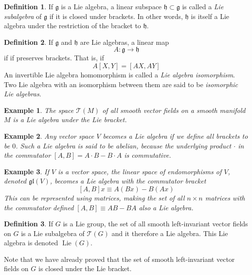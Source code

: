 \documentclass{article}
\DeclareMathOperator{\Lie}{Lie}
\newtheorem{example}{Example}[section]
\theoremstyle{remark}
\theoremstyle{definition}
\newtheorem{definition}{Definition}[section]
\begin{document}
\begin{definition}
If $\mathfrak{g}$ is a Lie algebra, a linear subspace $\mathfrak{h} \subset \mathfrak{g}$ is called a \textit{Lie subalgebra} of $\mathfrak{g}$ if it is closed under brackets. In other words, $\mathfrak{h}$ is itself a Lie algebra under the restriction of the bracket to $\mathfrak{h}$. 
\end{definition}

\begin{definition}
If $\mathfrak{g}$ and $\mathfrak{h}$ are Lie algebras, a linear map 
\[A: \mathfrak{g} \longrightarrow \mathfrak{h}\]
if if preserves brackets. That is, if 
\[A[X, Y] = [AX, AY]\]
An invertible Lie algebra homomorphism is called a \textit{Lie algebra isomorphism}. Two Lie algebra with an isomorphism between them are said to be \textit{isomorphic Lie algebras}. 
\end{definition}

\begin{example}
The space $\mathcal{T}(M)$ of all smooth vector fields on a smooth manifold $M$ is a Lie algebra under the Lie bracket. 
\end{example}

\begin{example}
Any vector space $V$ becomes a Lie algebra if we define all brackets to be $0$. Such a Lie algebra is said to be \textit{abelian}, because the underlying product $\cdot$ in the commutator $[A,B] = A \cdot B - B \cdot A$ is commutative. 
\end{example}

\begin{example}
If $V$ is a vector space, the linear space of endomorphisms of $V$, denoted $\mathfrak{gl}(V)$, becomes a Lie algebra with the commutator bracket
\[[A,B] x \equiv A (Bx) - B (Ax)\]
This can be represented using matrices, making the set of all $n \times n$ matrices with the commutator defined $[A,B] \equiv A B - B A$ also a Lie algebra. 
\end{example}

\begin{definition}
If $G$ is a Lie group, the set of all smooth left-invariant vector fields on $G$ is a Lie subalgebra of $\mathcal{T}(G)$ and it therefore a Lie algebra. This Lie algebra is denoted $\Lie(G)$.
\end{definition}

Note that we have already proved that the set of smooth left-invariant vector fields on $G$ is closed under the Lie bracket. 
\end{document}
